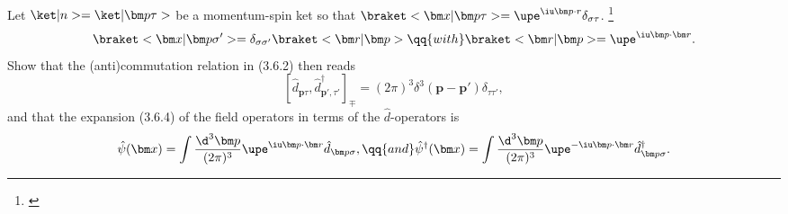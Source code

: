 \begin{problem}
  Let $\ket|n> = \ket|\bm p\tau>$ be a momentum-spin ket so that
  $\braket<\bm x|\bm p\tau> = \upe^{\iu\bm p\cdot r} \delta_{\sigma\tau}$.%
  \footnote{\citep[see][eq. (1.10)]{4_stefanucci2013nonequilibrium}}
  \[
    \braket<\bm x|\bm p\sigma'> = \delta_{\sigma\sigma'}\braket<\bm r|\bm p>
    \qq{with}
    \braket<\bm r|\bm p> = \upe^{\iu\bm p \cdot \bm r}.
  \]
  Show that the (anti)commutation relation in (3.6.2) then reads
  \[
    [\hat d_{\bm p\tau}, \hat d_{\bm p',\tau'}^\dagger]_\mp
  = (2\pi)^3 \delta^3(\bm p - \bm p') \delta_{\tau\tau'},
  \]
  and that the expansion (3.6.4) of the field operators in terms of the $\hat d$-operators is
  \[
    \hat\psi(\bm x) = \int \frac{\d^3\bm p}{(2\pi)^3}
      \upe^{\iu\bm p\cdot\bm r} \hat d_{\bm p\sigma}, \qq{and}
    \hat\psi^\dagger(\bm x) = \int \frac{\d^3\bm p}{(2\pi)^3}
      \upe^{-\iu\bm p \cdot\bm r} \hat d_{\bm p\sigma}^\dagger.
  \]
\end{problem}

